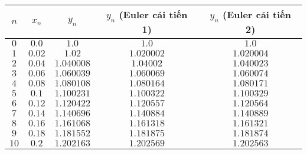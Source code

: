 \begin{center}
\begin{tabular}{|c|c|c|c|c|}\hline
	$n$  & $x_n$  & $y_n$      & $y_n$ (Euler cải tiến 1) & $y_n$ (Euler cải tiến 2) \\\hline
	$0$  & $0.0$  & $1.0$      & $1.0$      & $1.0$      \\\hline
	$1$  & $0.02$ & $1.02$     & $1.020002$ & $1.020004$ \\\hline
	$2$  & $0.04$ & $1.040008$ & $1.04002$  & $1.040023$ \\\hline
	$3$  & $0.06$ & $1.060039$ & $1.060069$ & $1.060074$ \\\hline
	$4$  & $0.08$ & $1.080108$ & $1.080164$ & $1.080171$ \\\hline
	$5$  & $0.1$  & $1.100231$ & $1.100322$ & $1.100329$ \\\hline
	$6$  & $0.12$ & $1.120422$ & $1.120557$ & $1.120564$ \\\hline
	$7$  & $0.14$ & $1.140696$ & $1.140884$ & $1.140889$ \\\hline
	$8$  & $0.16$ & $1.161068$ & $1.161318$ & $1.161321$ \\\hline
	$9$  & $0.18$ & $1.181552$ & $1.181875$ & $1.181874$ \\\hline
	$10$ & $0.2$  & $1.202163$ & $1.202569$ & $1.202563$ \\\hline
\end{tabular}
\end{center}
